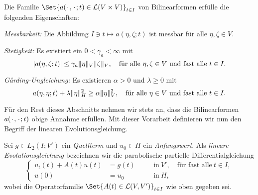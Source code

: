 \documentclass[../main.tex]{subfiles}
\begin{document}
\begin{Annahme}
\label{annahme:eigenschaften_der_bilinearform_a}
    Die Familie $\Set{a(\blank, \blank; t) \in \mathcal L(V \times V)}_{t \in I}$ von Bilinearformen erfülle die folgenden Eigenschaften:
    \leavevmode
    \begin{thmenumerate}
        \item \emph{Messbarkeit:} Die Abbildung $I \ni t \mapsto a(\eta, \zeta; t)$ ist messbar für alle $\eta, \zeta \in V$.
        \item \emph{Stetigkeit:}
        Es existiert ein $0 < \gamma_{a} < \infty$ mit
        \begin{equation}
            \label{eq:eigenschaften_der_bilinearform_a:stetigkeit}
            \abs{a(\eta, \zeta; t)} \leq \gamma_{a} \norm{\eta}_{V} \norm{\zeta}_{V}, \quad \fa \eta, \zeta \in V \text{ und fast alle } t \in I.
        \end{equation}
        \item \emph{G\r{a}rding-Ungleichung:}
        Es existieren $\alpha > 0$ und $\lambda \geq 0$ mit
        \begin{equation}
            \label{eq:eigenschaften_der_bilinearform_a:garding}
            a(\eta, \eta; t) + \lambda \norm{\eta}_{H}^{2} \geq \alpha \norm{\eta}_{V}^{2}, \quad \fa \eta \in V \text{ und fast alle } t \in I.
        \end{equation}
    \end{thmenumerate}
\end{Annahme}
%

Für den Rest dieses Abschnitts nehmen wir stets an, dass die Bilinearformen $a({\mkern2mu\cdot\mkern2mu}, {\mkern2mu\cdot\mkern2mu}; t)$ obige Annahme erfüllen.
Mit dieser Vorarbeit definieren wir nun den Begriff der linearen Evolutionsgleichung.

\begin{Definition}
\label{definition:lineare_evolutionsgleichung}
    Sei $g \in L_{2}(I; V')$ ein \emph{Quellterm} und $u_{0} \in H$ ein \emph{Anfangswert}.
    Als \emph{lineare Evolutionsgleichung} bezeichnen wir die parabolische partielle Differentialgleichung
    \begin{equation}
        \label{eq:lineare_evolutionsgleichung}
        \left\{
        \begin{aligned}
            u_{t}(t) + A(t) u(t) &= g(t)     \quad&&\text{in}~V', \quad \text{für fast alle}~t \in I, \\
            u(0) &= u_{0}                    \quad&&\text{in}~H,
        \end{aligned}
        \right.
    \end{equation}
    wobei die  Operatorfamilie $\Set{A(t) \in \mathcal L(V, V')}_{t \in I}$ wie oben gegeben sei.
\end{Definition}
\end{document}

